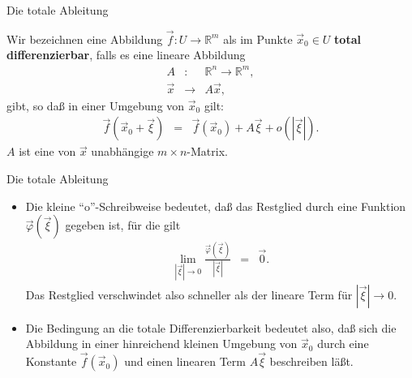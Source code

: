 \documentclass[german]{beamer}
\newcommand{\bq}{\begin{eqnarray*}}
\newcommand{\eq}{\end{eqnarray*}}
\begin{document}
\frame{\sectionpage}

\begin{frame}{Die totale Ableitung}

\begin{definition}
Wir bezeichnen eine Abbildung $\vec{f} : U \rightarrow {\mathbb R}^m$ als im Punkte $\vec{x}_0 \in U$
{\bf total differenzierbar}, falls es eine lineare Abbildung 
\bq
 A & : & {\mathbb R}^n \rightarrow {\mathbb R}^m,
 \nonumber \\
  \vec{x} & \rightarrow & A \vec{x},
\eq
gibt, so da{\ss} in einer Umgebung von $\vec{x}_0$ gilt:
\bq
 \vec{f}\left(\vec{x}_0+\vec{\xi}\right) & = & 
 \vec{f}\left(\vec{x}_0\right)
 + A \vec{\xi}
 + o\left(|\vec{\xi}|\right).
\eq
$A$ ist eine von $\vec{x}$ unabh\"angige $m \times n$-Matrix.
\end{definition}

\end{frame}

\begin{frame}{Die totale Ableitung}

\begin{itemize}
\item Die kleine ``o''-Schreibweise bedeutet, da{\ss} das Restglied durch eine Funktion $\vec{\varphi}(\vec{\xi})$ gegeben ist, f\"ur die 
gilt
\bq
 \lim\limits_{|\vec{\xi}|\rightarrow 0} \frac{\vec{\varphi}(\vec{\xi})}{|\vec{\xi}|} & = & \vec{0}.
\eq
Das Restglied verschwindet also schneller als der lineare Term f\"ur $|\vec{\xi}|\rightarrow 0$.

\item Die Bedingung an die totale Differenzierbarkeit bedeutet also, da{\ss} sich die Abbildung in einer hinreichend kleinen Umgebung
von $\vec{x}_0$ durch eine Konstante $\vec{f}\left(\vec{x}_0\right)$ und einen linearen Term $A \vec{\xi}$ beschreiben l\"a{\ss}t.
\end{itemize}

\end{frame}
\end{document}
